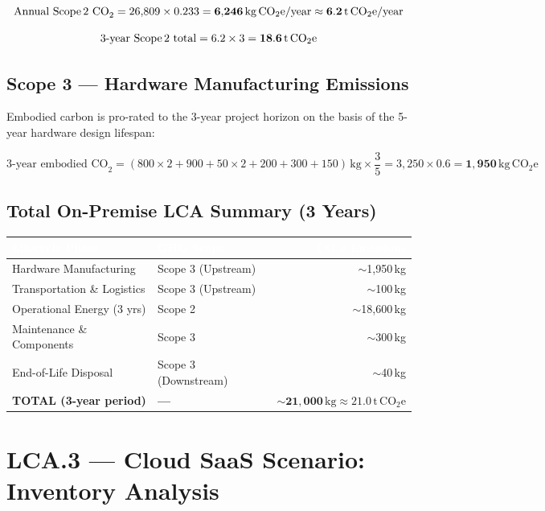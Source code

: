 \[
\text{Annual Scope\,2 CO}_{2}
  = 26{,}809 \times 0.233
  = \mathbf{6{,}246\,\mathrm{kg\,CO_2e/year}}
  \approx \mathbf{6.2\,\mathrm{t\,CO_2e/year}}
\]

\[
\text{3-year Scope\,2 total}
  = 6.2 \times 3
  = \mathbf{18.6\,\mathrm{t\,CO_2e}}
\]

\subsection{Scope 3 --- Hardware Manufacturing Emissions}

Embodied carbon is pro-rated to the 3-year project horizon on the basis of
the 5-year hardware design lifespan:

\[
\text{3-year embodied CO}_2
  = (800{\times}2 + 900 + 50{\times}2 + 200 + 300 + 150)\,\mathrm{kg}
    \times \frac{3}{5}
  = 3{,}250 \times 0.6
  = \mathbf{1{,}950\,\mathrm{kg\,CO_2e}}
\]

\subsection{Total On-Premise LCA Summary (3 Years)}

\vspace{0.5em}
\begin{tabularx}{\textwidth}{X l r}
\toprule
\rowcolor{headerrow}
\textcolor{white}{\textbf{Lifecycle Phase}} &
\textcolor{white}{\textbf{GHG Scope}} &
\textcolor{white}{\textbf{CO$_2$e Emissions}} \\
\midrule
\rowcolor{rowalt} Hardware Manufacturing & Scope 3 (Upstream)   & $\sim$1{,}950\,kg \\
                  Transportation \& Logistics & Scope 3 (Upstream) & $\sim$100\,kg \\
\rowcolor{rowalt} Operational Energy (3 yrs) & Scope 2             & $\sim$18{,}600\,kg \\
                  Maintenance \& Components   & Scope 3             & $\sim$300\,kg \\
\rowcolor{rowalt} End-of-Life Disposal        & Scope 3 (Downstream)& $\sim$40\,kg \\
\midrule
\rowcolor{palegreen}
  \textbf{TOTAL (3-year period)} & \textbf{---} &
  $\mathbf{\sim\!21{,}000\,\mathrm{kg} \approx 21.0\,\mathrm{t\,CO_2e}}$ \\
\bottomrule
\end{tabularx}

\section{LCA.3 --- Cloud SaaS Scenario: Inventory Analysis}

